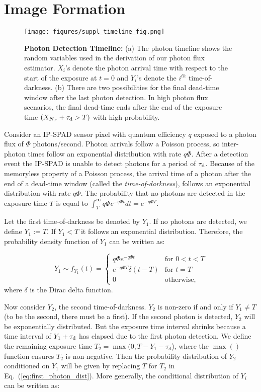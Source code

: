 \section{Image Formation}\label{suppl:MLE_conditional_derivation}

\begin{figure}[!ht]
\centering \texttt{[image: figures/suppl\_timeline\_fig.png]}
\caption{\textbf{Photon Detection Timeline:} (a) The photon timeline shows the
random variables used in the derivation of our photon flux estimator.  $X_i$'s
denote the photon arrival time with respect to the start of the exposure at
$t=0$ and $Y_i$'s denote the $i^{th}$ time-of-darkness. (b) There are two
possibilities for the final dead-time window after the last photon detection.
In high photon flux scenarios, the final dead-time ends after the end of the
exposure time $(X_{N_T}+\tau_\text{d} > T)$ with high probability.
\label{suppl:timeline}}
\end{figure}

Consider an IP-SPAD sensor pixel with quantum efficiency $q$ exposed to a
photon flux of $\Phi$ photons/second. Photon arrivals follow a Poisson process,
so inter-photon times follow an exponential distribution with rate $q\Phi$.
After a detection event the IP-SPAD is unable to detect photons for a period of
$\tau_\text{d}$. Because of the memoryless property of a Poisson process, the arrival
time of a photon after the end of a dead-time window (called the
\textit{time-of-darkness}), follows an exponential distribution with rate
$q\Phi$. The probability that no photons are detected in the exposure time $T$
is equal to $\int^\infty_T q\Phi e^{-q\Phi t} dt =e^{-q\Phi T}.$

Let the first time-of-darkness be denoted by $Y_1$. If no photons are detected,
we define $Y_1:=T$. If $Y_1<T$ it follows an exponential distribution.
Therefore, the probability density function of $Y_1$ can be written as:

\begin{equation}
Y_{1}{\sim}f_{Y_{1}}(t)=\begin{cases}
q\Phi e^{-q\Phi t} & \mbox{for } 0< t< T\\
e^{-q\Phi T} \delta(t-T)&\mbox{for } t=T\\
0 & \mbox{otherwise,}
\end{cases} \label{eq:first_photon_dist}
\end{equation}
where $\delta$ is the Dirac delta function.

Now consider $Y_2$, the second time-of-darkness. $Y_2$ is non-zero if and only
if $Y_1 \neq T$ (to be the second, there must be a first). If the second photon
is detected, $Y_2$ will be exponentially distributed. But the exposure time
interval shrinks because a time interval of $Y_1+\tau_\text{d}$ has elapsed due to
the first photon detection.  We define the remaining exposure time
$T_2=\max(0,T-Y_1-\tau_d$), where the $\max()$ function ensures $T_2$ is
non-negative. Then the probability distribution of $Y_2$ conditioned on $Y_1$
will be given by replacing $T$ for $T_2$ in Eq.~(\ref{eq:first_photon_dist}).
More generally, the conditional distribution of $Y_i$ can be written as:

